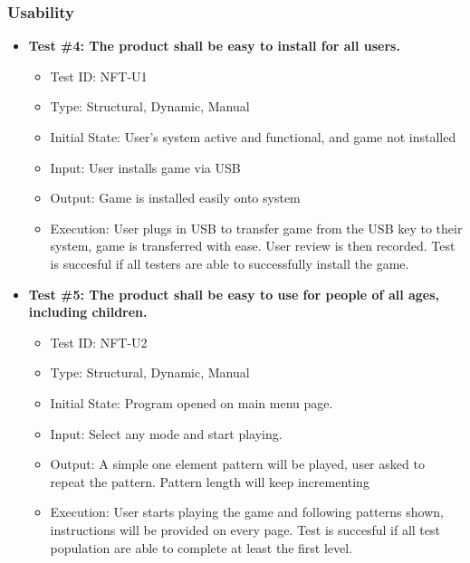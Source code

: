 \documentclass[12pt, titlepage]{article}
\begin{document}
\subsubsection{Usability}
\begin{itemize}
\item \textbf{Test \#4: The product shall be easy to install for all users.}
\begin{itemize}
\item Test ID: NFT-U1
\item Type: Structural, Dynamic, Manual			
\item Initial State: User's system active and functional, and game not installed 		
\item Input: User installs game via USB			
\item Output: Game is installed easily onto system				
\item Execution: User plugs in USB to transfer game from the USB key to their system, game is transferred with ease. User review is then recorded. Test is succesful if all testers are able to successfully install the game.
\end{itemize}

\item \textbf{Test \#5: The product shall be easy to use for people of all ages, including children.}
\begin{itemize}
\item Test ID: NFT-U2
\item Type: Structural, Dynamic, Manual				
\item Initial State: Program opened on main menu page.		
\item Input: Select any mode and start playing.
\item Output: A simple one element pattern will be played, user asked to repeat the pattern. Pattern length will keep incrementing
\item Execution: User starts playing the game and following patterns shown, instructions will be provided on every page. Test is succesful if all test population are able to complete at least the first level.
\end{itemize}


\end{itemize}
\end{document}
